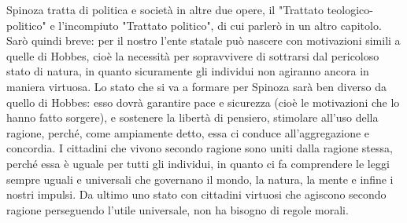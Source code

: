 Spinoza tratta di politica e società in altre due opere, il "Trattato teologico-politico" e l'incompiuto "Trattato politico", di cui parlerò in un altro capitolo. Sarò quindi breve: per il nostro l'ente statale può nascere con motivazioni simili a quelle di Hobbes, cioè la necessità per sopravvivere di sottrarsi dal pericoloso stato di natura, in quanto sicuramente gli individui non agiranno ancora in maniera virtuosa. Lo stato che si va a formare per Spinoza sarà ben diverso da quello di Hobbes: esso dovrà garantire pace e sicurezza (cioè le motivazioni che lo hanno fatto sorgere), e sostenere la libertà di pensiero, stimolare all'uso della ragione, perché, come ampiamente detto, essa ci conduce all'aggregazione e concordia. I cittadini che vivono secondo ragione sono uniti dalla ragione stessa, perché essa è uguale per tutti gli individui, in quanto ci fa comprendere le leggi sempre uguali e universali che governano il mondo, la natura, la mente e infine i nostri impulsi. Da ultimo uno stato con cittadini virtuosi che agiscono secondo ragione perseguendo l'utile universale, non ha bisogno di regole morali.



